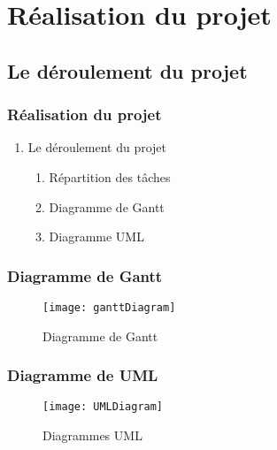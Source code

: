 \documentclass[12pt]{beamer}
\begin{document}
\section{Réalisation du projet}
\subsection{Le déroulement du projet}

\begin{frame}
\frametitle{Réalisation du projet}
 \begin{enumerate}
  \item Le déroulement du projet
    \begin{enumerate}
        \item Répartition des tâches
        \item Diagramme de Gantt
        \item Diagramme UML
    \end{enumerate}
 \end{enumerate}
\end{frame}


\begin{frame}
  \frametitle{Diagramme de Gantt}
  \begin{figure}[t]
    \centering
    \texttt{[image: ganttDiagram]}
    \caption{Diagramme de Gantt}
  \end{figure}
\end{frame}

\begin{frame}
  \frametitle{Diagramme de UML}
  \begin{figure}[t]
    \centering
    \texttt{[image: UMLDiagram]}
    \caption{Diagrammes UML}
  \end{figure}
\end{frame}
\end{document}
